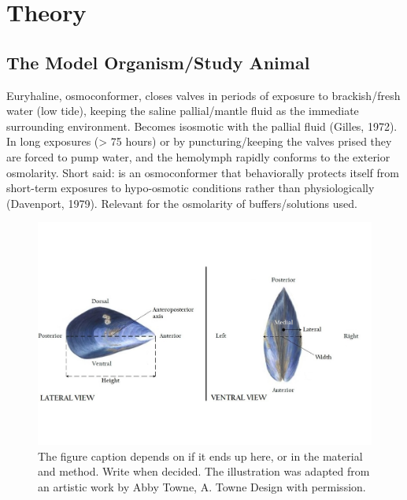 \chapter{Theory}
\section{The Model Organism/Study Animal}
Euryhaline, osmoconformer, closes valves in periods of exposure to brackish/fresh water (low tide), keeping the saline pallial/mantle fluid as the immediate surrounding environment. Becomes isosmotic with the pallial fluid (Gilles, 1972). In long exposures (> 75 hours) or by puncturing/keeping the valves prised they are forced to pump water, and the hemolymph rapidly conforms to the exterior osmolarity. Short said: is an osmoconformer that behaviorally protects itself from short-term exposures to hypo-osmotic conditions rather than physiologically (Davenport, 1979). Relevant for the osmolarity of buffers/solutions used.

\begin{figure}[h]
    \centering
    \includegraphics[width=\textwidth]{figures/Anatomy/M_edulis_anatomical_axis_lateral.jpg}
    \caption{The figure caption depends on if it ends up here, or in the material and method. Write when decided. The illustration was adapted from an artistic work by Abby Towne, A. Towne Design with permission.}
    \label{fig:anatomical_axis}
\end{figure}


